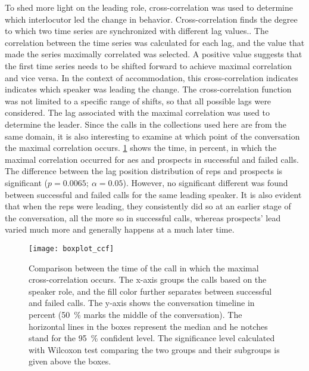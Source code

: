 To shed more light on the leading role, cross-correlation was used to determine which interlocutor led the change in behavior.
Cross-correlation finds the degree to which two time series are synchronized with different lag values..
The correlation between the time series was calculated for each lag, and the value that made the series maximally correlated was selected.
A positive value suggests that the first time series needs to be shifted forward to achieve maximal correlation and vice versa.
In the context of accommodation, this cross-correlation indicates indicates which speaker was leading the change.
The cross-correlation function was not limited to a specific range of shifts, so that all possible lags were considered.
The lag associated with the maximal correlation was used to determine the leader.
Since the calls in the collections used here are from the same domain, it is also interesting to examine at which point of the conversation the maximal correlation occurs.
\cref{fig:barplot_conv_leaders} shows the time, in percent, in which the maximal correlation occurred for \acp{ae} and prospects in successful and failed calls.
The difference between the lag position distribution of reps and prospects is significant ($p = 0.0065;\ \alpha = 0.05$).
However, no significant different was found between successful and failed calls for the same leading speaker.
It is also evident that when the reps were leading, they consistently did so at an earlier stage of the conversation, all the more so in successful calls, whereas prospects' lead varied much more and generally happens at a much later time.
%
\begin{figure}
	\centering
	\texttt{[image: boxplot\_ccf]}
	\caption[Representatives' and prospects' lead-taking times in successful and failed calls]
		{Comparison between the time of the call in which the maximal cross-correlation occurs.
		The x-axis groups the calls based on the speaker role, and the fill color further separates between successful and failed calls.
		The y-axis shows the conversation timeline in percent (\SI{50}{\percent} marks the middle of the conversation).
		The horizontal lines in the boxes represent the median
		and he notches stand for the \SI{95}{\percent} confident level.
		The significance level calculated with Wilcoxon test comparing the two groups and their subgroups is given above the boxes.}
	\label{fig:barplot_conv_leaders}
\end{figure}
